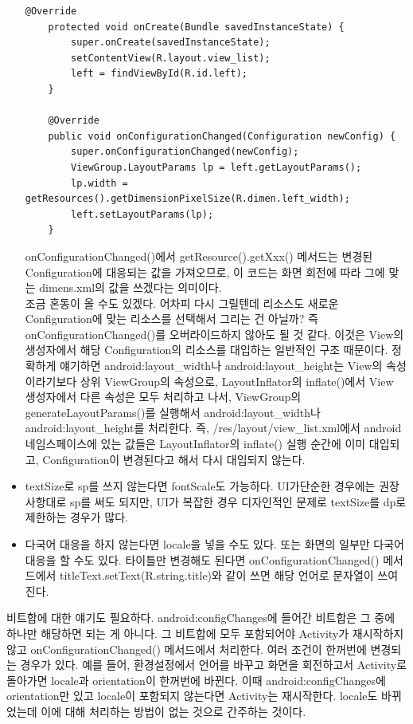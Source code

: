 \begin{itemize}
\begin{lstlisting}[frame=single]
	@Override
	protected void onCreate(Bundle savedInstanceState) {
		super.onCreate(savedInstanceState);
		setContentView(R.layout.view_list);
		left = findViewById(R.id.left);
	}

	@Override
	public void onConfigurationChanged(Configuration newConfig) {
		super.onConfigurationChanged(newConfig);
		ViewGroup.LayoutParams lp = left.getLayoutParams();
		lp.width = getResources().getDimensionPixelSize(R.dimen.left_width);
		left.setLayoutParams(lp);
	}
\end{lstlisting}
onConfigurationChanged()에서 getResource().getXxx() 메서드는 변경된 Configuration에 대응되는 값을 가져오므로, 이 코드는 화면 회전에 따라 그에 맞는 dimens.xml의 값을 쓰겠다는 의미이다.\\

조금 혼동이 올 수도 있겠다. 어차피 다시 그릴텐데 리소스도 새로운 Configuration에 맞는 리소스를 선택해서 그리는 건 아닐까? 
즉 onConfigurationChanged()를 오버라이드하지 않아도 될 것 같다.
이것은 View의 생성자에서 해당 Configuration의 리소스를 대입하는 일반적인 구조 때문이다. 정확하게 얘기하면 android:layout\_width나 android:layout\_height는 View의 속성이라기보다 상위 ViewGroup의 속성으로, LayoutInflator의 inflate()에서 View 생성자에서 다른 속성은 모두 처리하고 나서, ViewGroup의 generateLayoutParams()를 실행해서 android:layout\_width나 android:layout\_height를 처리한다.
즉, /res/layout/view\_list.xml에서 android 네임스페이스에 있는 값들은 LayoutInflator의 inflate() 실행 순간에 이미 대입되고, Configuration이 변경된다고 해서 다시 대입되지 않는다. 
	
\item textSize로 sp를 쓰지 않는다면 fontScale도 가능하다. UI가단순한 경우에는 권장사항대로 sp를 써도 되지만, UI가 복잡한 경우 디자인적인 문제로 textSize를 dp로 제한하는 경우가 많다.

\item 다국어 대응을 하지 않는다면 locale을 넣을 수도 있다. 또는 화면의 일부만 다국어 대응을 할 수도 있다. 타이틀만 변경해도 된다면 onConfigurationChanged() 메서드에서 titleText.setText(R.string.title)와 같이 쓰면 해당 언어로 문자열이 쓰여진다.
\end{itemize}

비트합에 대한 얘기도 필요하다. android:configChanges에 들어간 비트합은 그 중에 하나만 해당하면 되는 게 아니다. 그 비트합에 모두 포함되어야 Activity가 재시작하지 않고 onConfigurationChanged() 메서드에서 처리한다. 여러 조건이 한꺼번에 변경되는 경우가 있다. 예를 들어, 환경설정에서 언어를 바꾸고 화면을 회전하고서 Activity로 돌아가면 locale과 orientation이 한꺼번에 바뀐다. 이때 android:configChanges에 orientation만 있고 locale이 포함되지 않는다면 Activity는 재시작한다. locale도 바뀌었는데 이에 대해 처리하는 방법이 없는 것으로 간주하는 것이다.\\

